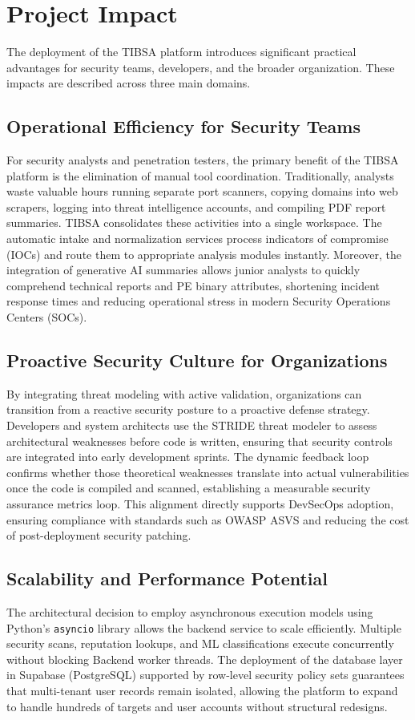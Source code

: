 \section{Project Impact}
\label{sec:ch7_project_impact}

The deployment of the TIBSA platform introduces significant practical advantages for security teams, developers, and the broader organization. These impacts are described across three main domains.

\subsection{Operational Efficiency for Security Teams}
For security analysts and penetration testers, the primary benefit of the TIBSA platform is the elimination of manual tool coordination. Traditionally, analysts waste valuable hours running separate port scanners, copying domains into web scrapers, logging into threat intelligence accounts, and compiling PDF report summaries. TIBSA consolidates these activities into a single workspace. The automatic intake and normalization services process indicators of compromise (IOCs) and route them to appropriate analysis modules instantly. Moreover, the integration of generative AI summaries allows junior analysts to quickly comprehend technical reports and PE binary attributes, shortening incident response times and reducing operational stress in modern Security Operations Centers (SOCs).

\subsection{Proactive Security Culture for Organizations}
By integrating threat modeling with active validation, organizations can transition from a reactive security posture to a proactive defense strategy. Developers and system architects use the STRIDE threat modeler to assess architectural weaknesses before code is written, ensuring that security controls are integrated into early development sprints. The dynamic feedback loop confirms whether those theoretical weaknesses translate into actual vulnerabilities once the code is compiled and scanned, establishing a measurable security assurance metrics loop. This alignment directly supports DevSecOps adoption, ensuring compliance with standards such as OWASP ASVS and reducing the cost of post-deployment security patching.

\subsection{Scalability and Performance Potential}
The architectural decision to employ asynchronous execution models using Python's \texttt{asyncio} library allows the backend service to scale efficiently. Multiple security scans, reputation lookups, and ML classifications execute concurrently without blocking Backend worker threads. The deployment of the database layer in Supabase (PostgreSQL) supported by row-level security policy sets guarantees that multi-tenant user records remain isolated, allowing the platform to expand to handle hundreds of targets and user accounts without structural redesigns.

